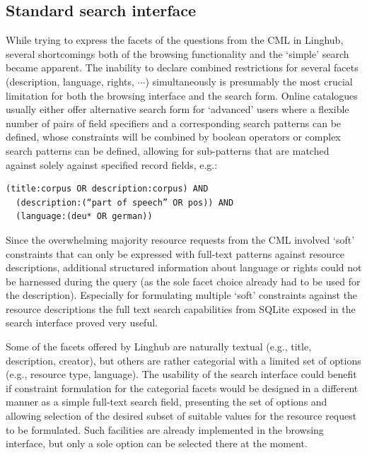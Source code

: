 \documentclass[smallextended]{svjour3}       %
\begin{document}
\subsection{Standard search interface}

While trying to express the facets of the questions from the CML in Linghub,
several shortcomings both of the browsing functionality and the `simple' search
became apparent. 
The inability to declare combined restrictions for several facets (description,
language, rights, $\cdots$) simultaneously is presumably the most crucial limitation
for both the browsing interface and the search form. Online catalogues usually
either offer alternative search form for `advanced' users where a flexible
number of pairs of field specifiers and a corresponding search patterns can be
defined, whose constraints will be combined by boolean operators or complex
search patterns can be defined, allowing for sub-patterns that are matched
against solely against specified record fields, e.g.:

\begin{verbatim}
(title:corpus OR description:corpus) AND 
  (description:(“part of speech” OR pos)) AND 
  (language:(deu* OR german))
\end{verbatim}

Since the overwhelming majority resource requests from the CML involved ‘soft’
constraints that can only be expressed with full-text patterns against resource
descriptions, additional structured information about language or rights could
not be harnessed during the query (as the sole facet choice already had to be
used for the description). Especially for formulating multiple ‘soft’
constraints against the resource descriptions the full text search capabilities
from SQLite exposed in the search interface proved very useful. 

Some of the facets offered by Linghub are naturally textual (e.g., title,
description, creator), but others are rather categorial with a limited set of
options (e.g., resource type, language). The usability of the search interface
could benefit if constraint formulation for the categorial facets would be
designed in a different manner as a simple full-text search field, presenting
the set of options and allowing selection of the desired subset of suitable
values for the resource request to be formulated. Such facilities are already
implemented in the browsing interface, but only a sole option can be selected
there at the moment.  
\end{document}
